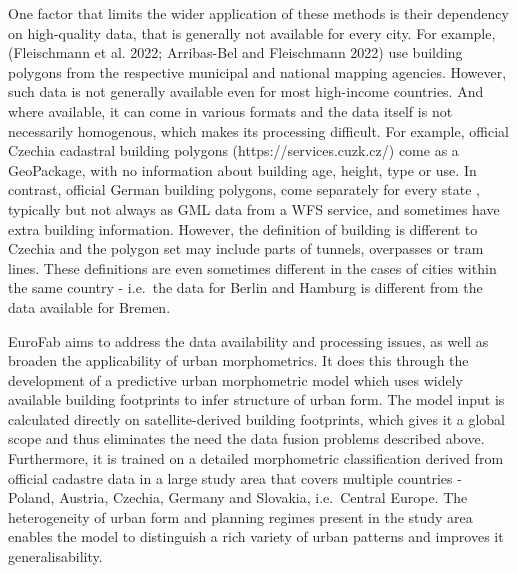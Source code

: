 \documentclass[
  letterpaper,
  DIV=11,
  numbers=noendperiod]{scrartcl}
\begin{document}
One factor that limits the wider application of these methods is their
dependency on high-quality data, that is generally not available for
every city. For example, (Fleischmann et al. 2022; Arribas-Bel and
Fleischmann 2022) use building polygons from the respective municipal
and national mapping agencies. However, such data is not generally
available even for most high-income countries. And where available, it
can come in various formats and the data itself is not necessarily
homogenous, which makes its processing difficult. For example, official
Czechia cadastral building polygons (https://services.cuzk.cz/) come as
a GeoPackage, with no information about building age, height, type or
use. In contrast, official German building polygons, come separately for
every state , typically but not always as GML data from a WFS service,
and sometimes have extra building information. However, the definition
of building is different to Czechia and the polygon set may include
parts of tunnels, overpasses or tram lines. These definitions are even
sometimes different in the cases of cities within the same country -
i.e.~the data for Berlin and Hamburg is different from the data
available for Bremen.

EuroFab aims to address the data availability and processing issues, as
well as broaden the applicability of urban morphometrics. It does this
through the development of a predictive urban morphometric model which
uses widely available building footprints to infer structure of urban
form. The model input is calculated directly on satellite-derived
building footprints, which gives it a global scope and thus eliminates
the need the data fusion problems described above. Furthermore, it is
trained on a detailed morphometric classification derived from official
cadastre data in a large study area that covers multiple countries -
Poland, Austria, Czechia, Germany and Slovakia, i.e.~Central Europe. The
heterogeneity of urban form and planning regimes present in the study
area enables the model to distinguish a rich variety of urban patterns
and improves it generalisability.
\end{document}
